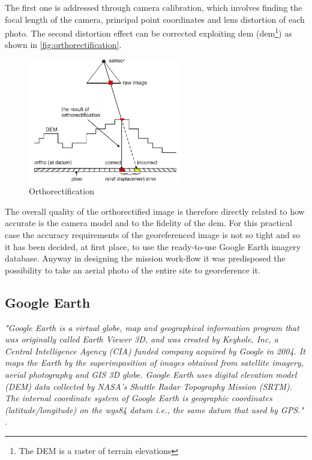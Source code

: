 The first one is addressed through camera calibration, which involves finding the focal length of the camera, principal point coordinates and lens distortion of each photo.
The second distortion effect can be corrected exploiting \acrlong{dem} (\acrshort{dem}\footnote{The DEM is a raster of terrain elevations}) as shown in \autoref{fig:orthorectification}.
\begin{figure}[ht]
    \centering
    \includegraphics[width=0.6\textwidth]{figures/C2/Ortophoto.png}
    \caption{Orthorectification}
    \label{fig:orthorectification}
\end{figure}
The overall quality of the orthorectified image is therefore directly related to how accurate is the camera model and to the fidelity of the \acrshort{dem}. For this practical case the accuracy requirements of the georeferenced image is not so tight and so it has been decided, at first place, to use the ready-to-use Google Earth imagery database. Anyway in designing the mission work-flow it was predisposed the possibility to take an aerial photo of the entire site to georeference it.

\subsection{Google Earth} %
\label{ssec:orthophoto_database}

\textit{"Google Earth is a virtual globe, map and geographical information program that was originally called Earth Viewer 3D, and was created by Keyhole, Inc, a Central Intelligence Agency (CIA) funded company acquired by Google in 2004. It maps the Earth by the superimposition of images obtained from satellite imagery, aerial photography and GIS 3D globe. Google Earth uses digital elevation model (DEM) data collected by NASA's Shuttle Radar Topography Mission (SRTM). The internal coordinate system of Google Earth is geographic coordinates (latitude/longitude) on the \acrfull{wgs84} datum i.e., the same datum that used by GPS."} \cite{PosAccuracyGE}.\\

